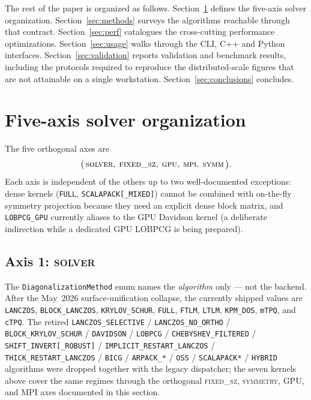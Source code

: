 \documentclass[submission, PhysCodeb]{SciPost}
\begin{document}
The rest of the paper is organized as follows.
Section~\ref{sec:axes} defines the five-axis solver organization.
Section~\ref{sec:methods} surveys the algorithms reachable through
that contract.
Section~\ref{sec:perf} catalogues the cross-cutting performance
optimizations.
Section~\ref{sec:usage} walks through the CLI, C++ and Python
interfaces.
Section~\ref{sec:validation} reports validation and benchmark
results, including the protocols required to reproduce the
distributed-scale figures that are not attainable on a single
workstation.
Section~\ref{sec:conclusions} concludes.

\section{Five-axis solver organization}
\label{sec:axes}

The five orthogonal axes are
\begin{equation}
\bigl(\,\textsc{solver},\;
        \textsc{fixed\_sz},\;
        \textsc{gpu},\;
        \textsc{mpi},\;
        \textsc{symm}\,\bigr).
\label{eq:five-axes}
\end{equation}
Each axis is independent of the others up to two well-documented
exceptions: dense kernels (\texttt{FULL}, \texttt{SCALAPACK[\_MIXED]})
cannot be combined with on-the-fly symmetry projection because they
need an explicit dense block matrix, and \texttt{LOBPCG\_GPU}
currently aliases to the GPU Davidson kernel (a deliberate
indirection while a dedicated GPU LOBPCG is being prepared).

\subsection{Axis 1: \textsc{solver}}
\label{sec:axes-solver}
The \texttt{DiagonalizationMethod} enum names the \emph{algorithm}
only --- not the backend. After the May~2026 surface-unification
collapse, the currently shipped values are
\texttt{LANCZOS}, \texttt{BLOCK\_LANCZOS}, \texttt{KRYLOV\_SCHUR},
\texttt{FULL}, \texttt{FTLM}, \texttt{LTLM}, \texttt{KPM\_DOS},
\texttt{mTPQ}, and \texttt{cTPQ}. The retired
\texttt{LANCZOS\_SELECTIVE} / \texttt{LANCZOS\_NO\_ORTHO} /
\texttt{BLOCK\_KRYLOV\_SCHUR} / \texttt{DAVIDSON} / \texttt{LOBPCG} /
\texttt{CHEBYSHEV\_FILTERED} / \texttt{SHIFT\_INVERT[\_ROBUST]} /
\texttt{IMPLICIT\_RESTART\_LANCZOS} / \texttt{THICK\_RESTART\_LANCZOS} /
\texttt{BICG} / \texttt{ARPACK\_*} / \texttt{OSS} / \texttt{SCALAPACK*} /
\texttt{HYBRID} algorithms were dropped together with the legacy
dispatcher; the seven kernels above cover the same regimes through
the orthogonal \textsc{fixed\_sz}, \textsc{symmetry}, GPU, and MPI
axes documented in this section.
\end{document}
